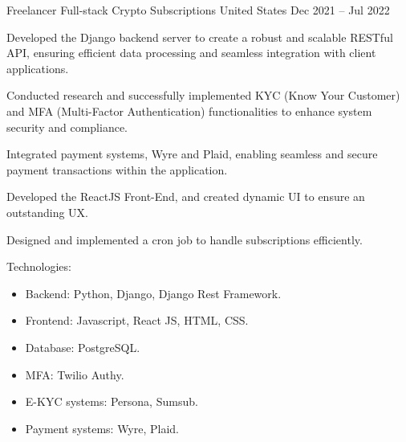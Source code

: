 \begin{cventries}
    \cventry
    {Freelancer Full-stack} %
    {Crypto Subscriptions} %
    {United States} %
    {Dec 2021 – Jul 2022} %
    {
      \begin{cvitems} %
        \item {Developed the Django backend server to create a robust and scalable RESTful API, ensuring efficient data processing and seamless integration with client applications.}
        \item {Conducted research and successfully implemented KYC (Know Your Customer) and MFA (Multi-Factor Authentication) functionalities to enhance system security and compliance.}
        \item {Integrated payment systems, Wyre and Plaid, enabling seamless and secure payment transactions within the application.}
        \item {Developed the ReactJS Front-End, and created dynamic UI to ensure an outstanding UX.}
        \item {Designed and implemented a cron job to handle subscriptions efficiently.}
        \item {Technologies:
            \begin{itemize}
                \item {Backend: Python, Django, Django Rest Framework.}
                \item {Frontend: Javascript, React JS, HTML, CSS.}
                \item {Database: PostgreSQL.}
                \item {MFA: Twilio Authy.}
                \item {E-KYC systems: Persona, Sumsub.}
                \item {Payment systems: Wyre, Plaid.}
            \end{itemize}
        }
      \end{cvitems}
    }


\end{cventries}

